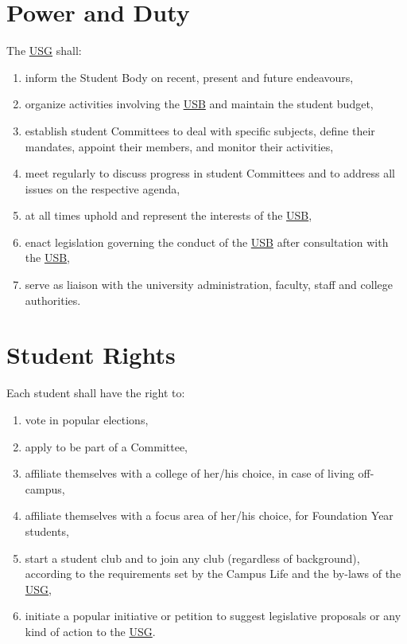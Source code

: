 \section{Power and Duty}
The \hyperref[USGdef]{USG} shall: 
\begin{enumerate}
\item inform the Student Body on recent, present and future endeavours,
\item organize activities involving the \hyperref[studentbody]{USB} and maintain the student budget,
\item establish student Committees to deal with specific subjects, define their mandates, appoint their members, and monitor their activities,
\item meet regularly to discuss progress in student Committees and to address all issues on the respective agenda,
\item at all times uphold and represent the interests of the \hyperref[studentbody]{USB},
\item enact legislation governing the conduct of the \hyperref[studentbody]{USB} after consultation with the \hyperref[studentbody]{USB},
\item serve as liaison with the university administration, faculty, staff and college authorities.
\end{enumerate}

\section{Student Rights}
Each student shall have the right to:
\begin{enumerate}[nosep] 
\item vote in popular elections,

\item apply to be part of a Committee,
\item affiliate themselves with a college of her/his choice, in case of living off-campus,
\item affiliate themselves with a focus area of her/his choice, for Foundation Year students,
\item start a student club and to join any club (regardless of background), according to the requirements set by the Campus Life and the by-laws of the \hyperref[USGdef]{USG},
\item initiate a popular initiative or petition to suggest legislative proposals or any kind of action to the \hyperref[USGdef]{USG}.
\end{enumerate}

